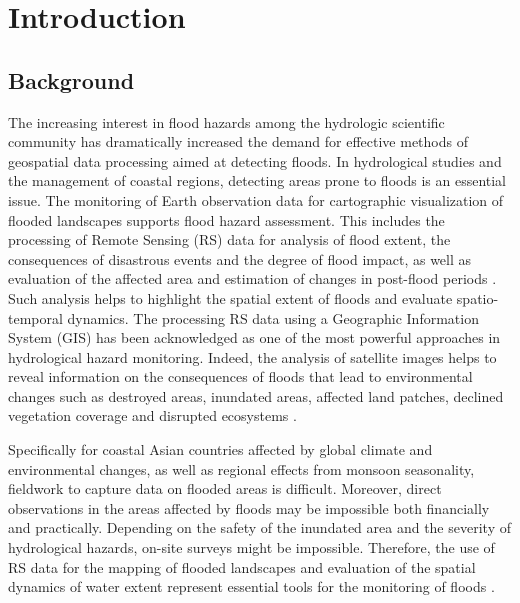 \documentclass[water,article,accept,pdftex,oneauhor]{Definitions/mdpi}
\begin{document}
\section{Introduction}

\subsection{Background}
{The increasing interest in flood hazards among the hydrologic scientific community has dramatically increased the demand for effective methods of geospatial data processing aimed at detecting floods. }In hydrological studies and the management {of coastal regions}, detecting areas prone to floods is an essential issue. {The monitoring of Earth observation data for }cartographic visualization of flooded landscapes{ supports} flood hazard assessment. {This} includes the {processing of Remote Sensing (RS) data for} analysis of {flood extent, the consequences of disastrous events and }the degree of flood impact, as well as evaluation of the affected area and estimation of changes in post-flood periods \cite{su142114145,w15152802,su142316270}. Such analysis helps to highlight{ }the spatial extent of{ }floods and {evaluate }spatio-temporal dynamics. {The processing RS data using a Geographic Information System (GIS)} has been acknowledged as one of the most powerful approaches in hydrological hazard monitoring. Indeed, the {analysis of }satellite images{ }helps to reveal information {on} the consequences of floods {that lead to } environmental changes such as{ }destroyed areas, {inundated areas}, affected land patches, declined vegetation coverage and disrupted ecosystems \cite{ijgi12110465,rs15102561}. 

Specifically for coastal Asian countries affected by {global climate and environmental changes, as well as regional effects from }monsoon seasonality, fieldwork to capture data on flooded areas is difficult{. Moreover, direct observations in the areas affected by floods may be impossible }both financially and {practically. Depending} on the safety of the inundated area and the severity of hydrological hazards, {on-site surveys }might {be} impossible. Therefore, the {use of }RS data{ }for the mapping of flooded landscapes and {evaluation of the }spatial dynamics of water extent {represent essential }tools for the monitoring of {floods}%
 \cite{YASEEN2024101665,GHALEHTEIMOURI2023}. 
\end{document}
